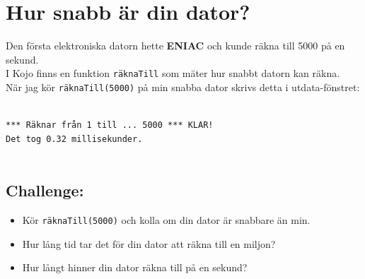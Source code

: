 \chapter{Hur snabb är din dator?}Den första elektroniska datorn hette {\bf ENIAC} och kunde räkna till 5000 på en sekund.\\
I Kojo finns en funktion \lstinline{räknaTill} som mäter hur snabbt datorn kan räkna.\\
När jag kör \lstinline{räknaTill(5000)} på min snabba dator skrivs detta i utdata-fönstret:

\begin{lstlisting}[numbers=none]

*** Räknar från 1 till ... 5000 *** KLAR!
Det tog 0.32 millisekunder.
      
\end{lstlisting}
        
\section*{\color{BrickRed}Challenge:}


\begin{itemize}

\item {Kör \lstinline{räknaTill(5000)} och kolla om din dator är snabbare än min.}
\item {Hur lång tid tar det för din dator att räkna till en miljon?}
\item {Hur långt hinner din dator räkna till på en sekund?}

\end{itemize}


